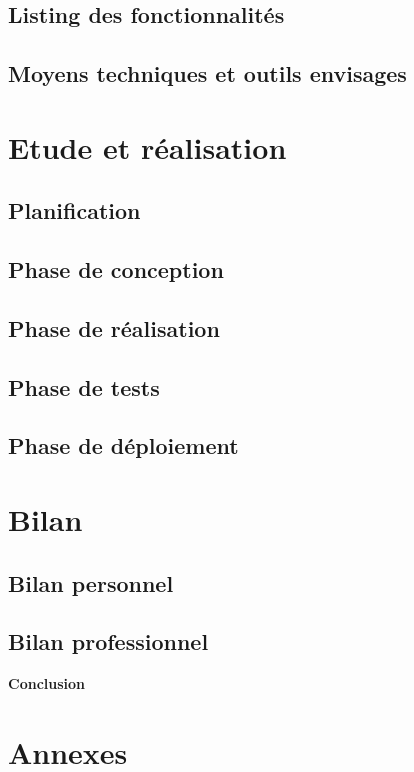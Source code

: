 \documentclass[a4paper]{article}
\begin{document}
    \subsection{Listing des fonctionnalités}
    \subsection{Moyens techniques et outils envisages}

    \section{Etude et réalisation}
    \subsection{Planification}
    \subsection{Phase de conception}
    \subsection{Phase de réalisation}
    \subsection{Phase de tests}
    \subsection{Phase de déploiement}
   
    \section{Bilan}
    \subsection{Bilan personnel}
    \subsection{Bilan professionnel}

    \huge \textbf{Conclusion} \vspace{5pt} \\
   
    \section{Annexes}
    
\end{document}
